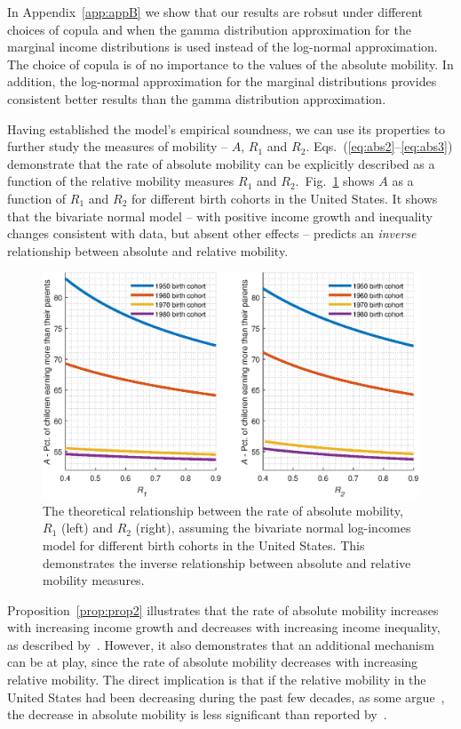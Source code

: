 \documentclass[12pt]{article}
\newcommand{\Pref}[1]{Proposition~\ref{prop:#1}}
\newcommand{\flabel}[1]{\label{fig:#1}}
\newcommand{\fref}[1]{Fig.~\ref{fig:#1}}
\numberwithin{equation}{section}
\begin{document}
In Appendix~\ref{app:appB} we show that our results are robsut under different choices of copula and when the gamma distribution approximation for the marginal income distributions is used instead of the log-normal approximation. The choice of copula is of no importance to the values of the absolute mobility. In addition, the log-normal approximation for the marginal distributions provides consistent better results than the gamma distribution approximation.

Having established the model's empirical soundness, we can use its properties to further study the measures of mobility -- $A$, $R_1$ and $R_2$. Eqs.~(\ref{eq:abs2}--\ref{eq:abs3}) demonstrate that the rate of absolute mobility can be explicitly described as a function of the relative mobility measures $R_1$ and $R_2$.~\fref{relat} shows $A$ as a function of $R_1$ and $R_2$ for different birth cohorts in the United States. It shows that the bivariate normal model -- with positive income growth and inequality changes consistent with data, but absent other effects -- predicts an \textit{inverse} relationship between absolute and relative mobility.

\begin{figure}[!htb]
\centering
\includegraphics[width=1.0\textwidth] {./figs/R1_R2.eps}
\caption{The theoretical relationship between the rate of absolute mobility, $R_1$ (left) and $R_2$ (right), assuming the bivariate normal log-incomes model for different birth cohorts in the United States. This demonstrates the inverse relationship between absolute and relative mobility measures.}
\flabel{relat}
\end{figure}

\Pref{prop2} illustrates that the rate of absolute mobility increases with increasing income growth and decreases with increasing income inequality, as described by~\citet{chetty2017fading}. However, it also demonstrates that an additional mechanism can be at play, since the rate of absolute mobility decreases with increasing relative mobility. The direct implication is that if the relative mobility in the United States had been decreasing during the past few decades, as some argue~\citep{aaronson2008intergenerational,putnam2012growing}, the decrease in absolute mobility is less significant than reported by~\citet{chetty2017fading}.
\end{document}
